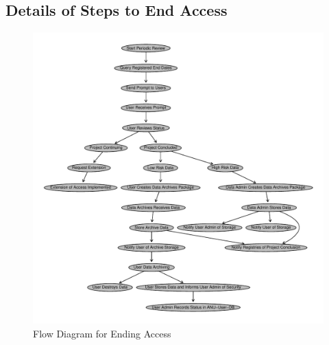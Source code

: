 \documentclass[a4paper]{article}
\begin{document}
\subsection{Details of Steps to End Access}
\label{sec-5-3}



\begin{figure}[!h]
\centering
\includegraphics[width=\textwidth]{DataAccessFlowDiagram-EndAccess.pdf}
\caption{Flow Diagram for Ending Access}
\label{fig:DataAccessFlowDiagram-EndAccess}
\end{figure}
\clearpage
\end{document}
